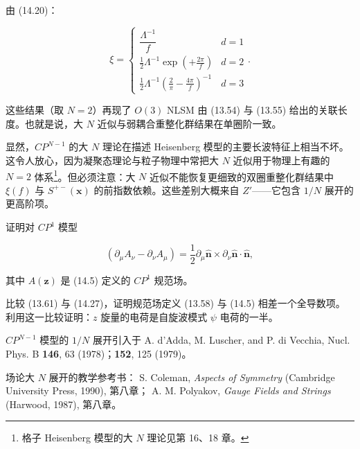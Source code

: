 由 (14.20)：

\begin{equation*}
\xi = \left\{ \begin{array}{ll} \dfrac {\Lambda^ {- 1}}{f} & d = 1 \\[6pt] \frac {1}{2} \Lambda^ {- 1} \exp \left( + \frac {2 \pi}{f} \right) & d = 2 \\[6pt] \frac {1}{2} \Lambda^ {- 1} \left( \frac {2}{\pi} - \frac {4 \pi}{f} \right) ^ {- 1} & d = 3 \end{array} \right..
\tag{14.26}
\end{equation*}

这些结果（取 $N = 2$）再现了 $O(3)$ NLSM 由 (13.54) 与 (13.55) 给出的关联长度。也就是说，大 $N$ 近似与弱耦合重整化群结果在单圈阶一致。

显然，$CP^{N-1}$ 的大 $N$ 理论在描述 Heisenberg 模型的主要长波特征上相当不坏。这令人放心，因为凝聚态理论与粒子物理中常把大 $N$ 近似用于物理上有趣的 $N = 2$ 体系\footnote{格子 Heisenberg 模型的大 $N$ 理论见第 16、18 章。}。但必须注意：大 $N$ 近似不能恢复更细致的双圈重整化群结果中 $\xi(f)$ 与 $S^{+-}(\mathbf{x})$ 的前指数依赖。这些差别大概来自 $Z'$——它包含 $1/N$ 展开的更高阶项。

\begin{exercises}

\item 证明对 $CP^1$ 模型

\begin{equation*}
\left( \partial_ {\mu} A _ {\nu} - \partial_ {\nu} A _ {\mu} \right) = \frac {1}{2} \partial_ {\mu} \hat {\mathbf {n}} \times \partial_ {\nu} \hat {\mathbf {n}} \cdot \hat {\mathbf {n}} ,
\tag{14.27}
\end{equation*}

其中 $A(\mathbf{z})$ 是 (14.5) 定义的 $CP^1$ 规范场。

\item 比较 (13.61) 与 (14.27)，证明规范场定义 (13.58) 与 (14.5) 相差一个全导数项。利用这一比较证明：$z$ 旋量的电荷是自旋波模式 $\psi$ 电荷的一半。

\end{exercises}

\begin{chapbib}
\item $CP^{N - 1}$ 模型的 $1/N$ 展开引入于
  A. d'Adda, M. Luscher, and P. di Vecchia, Nucl. Phys. B \textbf{146}, 63 (1978)；\textbf{152}, 125 (1979)。
\item 场论大 $N$ 展开的教学参考书：
  S. Coleman, \textit{Aspects of Symmetry} (Cambridge University Press, 1990), 第八章；
  A. M. Polyakov, \textit{Gauge Fields and Strings} (Harwood, 1987), 第八章。
\end{chapbib}
